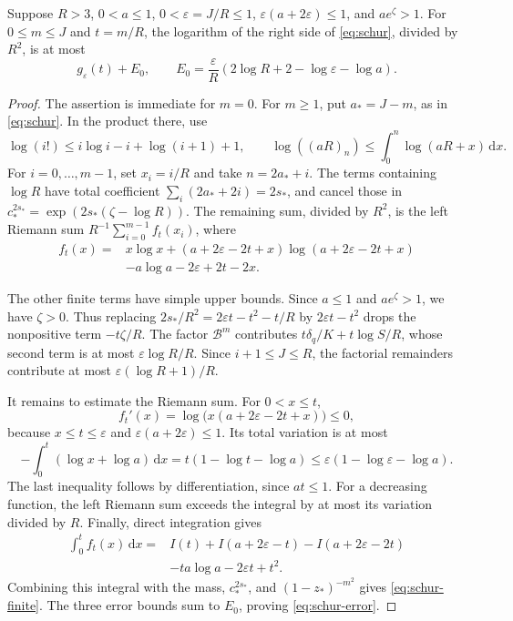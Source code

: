 \begin{proposition}\label{prop:schur-finite-error}
Suppose $R>3$, $0<a\leq1$, $0<\varepsilon=J/R\leq1$,
$\varepsilon(a+2\varepsilon)\leq1$, and $ae^\zeta>1$.
For $0\leq m\leq J$ and $t=m/R$, the logarithm of the right side of
\eqref{eq:schur}, divided by $R^2$, is at most
\begin{equation}\label{eq:schur-error}
 g_\varepsilon(t)+E_0,\qquad
 E_0=\frac{\varepsilon}{R}
           (2\log R+2-\log\varepsilon-\log a).
\end{equation}
\end{proposition}
\begin{proof}
The assertion is immediate for $m=0$. For $m\geq1$, put $a_*=J-m$,
as in \eqref{eq:schur}. In the product there, use
\[
 \log(i!)\leq i\log i-i+\log(i+1)+1,\qquad
 \log((aR)_n)\leq\int_0^n\log(aR+x)\,\mathrm dx.
\]
For $i=0,\ldots,m-1$, set $x_i=i/R$ and take $n=2a_*+i$.
The terms containing $\log R$ have total coefficient
$\sum_i(2a_*+2i)=2s_*$, and cancel those in
$c_*^{2s_*}=\exp(2s_*(\zeta-\log R))$.
The remaining sum, divided by $R^2$, is the left Riemann sum
$R^{-1}\sum_{i=0}^{m-1}f_t(x_i)$, where
\[
 \begin{split}
 f_t(x)={}&x\log x+(a+2\varepsilon-2t+x)
                         \log(a+2\varepsilon-2t+x)\\
          &-a\log a-2\varepsilon+2t-2x.
 \end{split}
\]

The other finite terms have simple upper bounds. Since $a\leq1$ and
$ae^\zeta>1$, we have $\zeta>0$. Thus replacing
$2s_*/R^2=2\varepsilon t-t^2-t/R$ by $2\varepsilon t-t^2$ drops the
nonpositive term $-t\zeta/R$. The factor $\mathcal B^m$ contributes
$t\delta_q/K+t\log S/R$, whose second term is at most
$\varepsilon\log R/R$. Since $i+1\leq J\leq R$, the factorial
remainders contribute at most $\varepsilon(\log R+1)/R$.

It remains to estimate the Riemann sum. For $0<x\leq t$,
\[
 f_t'(x)=\log\bigl(x(a+2\varepsilon-2t+x)\bigr)\leq0,
\]
because $x\leq t\leq\varepsilon$ and
$\varepsilon(a+2\varepsilon)\leq1$. Its total variation is at most
\[
 -\int_0^t(\log x+\log a)\,\mathrm dx
 =t(1-\log t-\log a)
 \leq\varepsilon(1-\log\varepsilon-\log a).
\]
The last inequality follows by differentiation, since $at\leq1$.
For a decreasing function, the left Riemann sum exceeds the integral
by at most its variation divided by $R$. Finally, direct integration
gives
\[
 \begin{split}
 \int_0^t f_t(x)\,\mathrm dx
 ={}&I(t)+I(a+2\varepsilon-t)-I(a+2\varepsilon-2t)\\
    &-ta\log a-2\varepsilon t+t^2.
 \end{split}
\]
Combining this integral with the mass, $c_*^{2s_*}$, and
$(1-z_*)^{-m^2}$ gives \eqref{eq:schur-finite}. The three error bounds
sum to $E_0$, proving \eqref{eq:schur-error}.
\end{proof}

